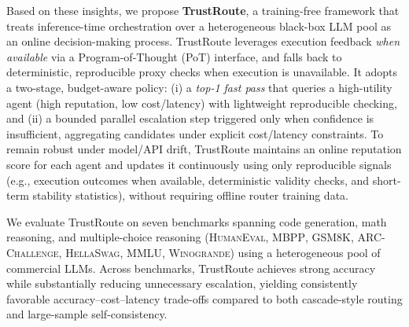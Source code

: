 \documentclass[acmsmall,screen,review,anonymous]{acmart}
\begin{document}
Based on these insights, we propose \textbf{TrustRoute}, a training-free framework that treats inference-time orchestration over a heterogeneous black-box LLM pool as an online decision-making process.
TrustRoute leverages execution feedback \emph{when available} via a Program-of-Thought (PoT) interface, and falls back to deterministic, reproducible proxy checks when execution is unavailable.
It adopts a two-stage, budget-aware policy: (i) a \emph{top-1 fast pass} that queries a high-utility agent (high reputation, low cost/latency) with lightweight reproducible checking, and (ii) a bounded parallel escalation step triggered only when confidence is insufficient, aggregating candidates under explicit cost/latency constraints.
To remain robust under model/API drift, TrustRoute maintains an online reputation score for each agent and updates it continuously using only reproducible signals (e.g., execution outcomes when available, deterministic validity checks, and short-term stability statistics), without requiring offline router training data.

We evaluate TrustRoute on seven benchmarks spanning code generation, math reasoning, and multiple-choice reasoning
(\textsc{HumanEval}, \textsc{MBPP}, \textsc{GSM8K}, \textsc{ARC-Challenge}, \textsc{HellaSwag}, \textsc{MMLU}, \textsc{Winogrande})
using a heterogeneous pool of commercial LLMs.
Across benchmarks, TrustRoute achieves strong accuracy while substantially reducing unnecessary escalation, yielding consistently favorable accuracy--cost--latency trade-offs compared to both cascade-style routing and large-sample self-consistency.
\end{document}

